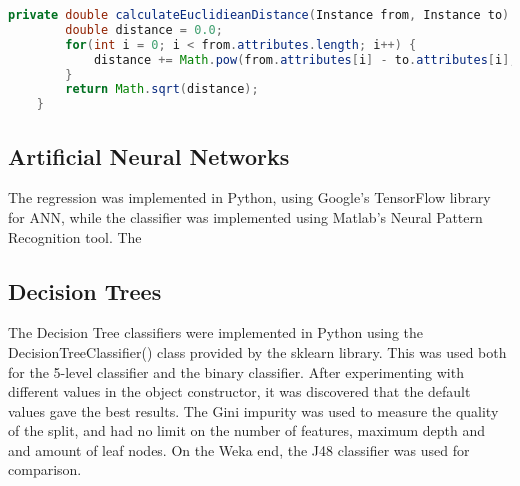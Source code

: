 \begin{lstlisting}[language=Java, caption={Calculate euclidean distance}, label=lst:kNNEuclidean]
private double calculateEuclidieanDistance(Instance from, Instance to) {
		double distance = 0.0;
		for(int i = 0; i < from.attributes.length; i++) {
			distance += Math.pow(from.attributes[i] - to.attributes[i], 2);
		}
		return Math.sqrt(distance);
	}
\end{lstlisting}

\subsection{Artificial Neural Networks}
The regression was implemented in Python, using Google's TensorFlow library for ANN, while the classifier was implemented using Matlab's Neural Pattern Recognition tool. The 

\subsection{Decision Trees}
The Decision Tree classifiers were implemented in Python using the DecisionTreeClassifier() class provided by the sklearn library. This was used both for the 5-level classifier and the binary classifier. After experimenting with different values in the object constructor, it was discovered that the default values gave the best results. The Gini impurity was used to measure the quality of the split, and had no limit on the number of features, maximum depth and and amount of leaf nodes. On the Weka end, the J48 classifier was used for comparison.